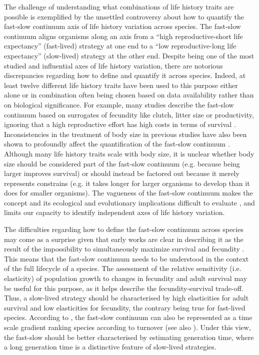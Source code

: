 The challenge of understanding what combinations of life history traits are
possible is exemplified by the unsettled controversy about how to quantify the
fast-slow continuum axis of life history variation across species. The fast-slow
continuum aligns organisms along an axis from a “high reproductive-short life
expectancy” (fast-lived) strategy at one end to a “low reproductive-long life
expectancy” (slow-lived) strategy at the other end. Despite being one of the
most studied and influential axes of life history variation, there are notorious
discrepancies regarding how to define and quantify it across species. Indeed, at
least twelve different life history traits have been used to this purpose either
alone or in combination
often being chosen based on data availability rather than on biological
significance. For example, many studies describe the fast-slow continuum based
on surrogates of fecundity like clutch, litter size or productivity, ignoring
that a high reproductive effort has high costs in terms of survival
\citep{Adler2014}. Inconsistencies in the treatment of body size in previous
studies have also been shown to profoundly affect the quantification of the
fast-slow continuum \citep{Jeschke2009}.
Although many life history traits scale with body size, it is unclear whether
body size should be considered part of the fast-slow continuum (e.g. because
being larger improves survival) or should instead be factored out because it
merely represents constrains (e.g. it takes longer for larger organisms to
develop than it does for smaller organisms). The vagueness of the fast-slow
continuum makes the concept and its ecological and evolutionary implications
difficult to evaluate \citep{Jeschke2009}, and limits our capacity to identify
independent axes of life history variation.

The difficulties regarding how to define the fast-slow continuum across species
may come as a surprise given that early works are clear in describing it as the
result of the impossibility to simultaneously maximize survival and fecundity
\citep{Stearns1983a, Saether1988}. This means that the fast-slow continuum needs
to be understood in the context of the full lifecycle of a species. The
assessment of the relative sensitivity (i.e. elasticity) of population growth to
changes in fecundity and adult survival may be useful for this purpose, as it
helps describe the fecundity-survival trade-off. Thus, a slow-lived strategy
should be characterised by high elasticities for adult survival and low
elasticities for fecundity, the contrary being true for fast-lived species.
According to \citet{Gaillard1989}, the fast-slow continuum can also be 
represented as a time scale gradient ranking species according to turnover (see 
also \citet{Jeschke2009,Saether2013,Adler2014}⁠). Under this view, the
fast-slow should be better characterised by estimating generation time, where a 
long generation time is a distinctive feature of slow-lived strategies.

